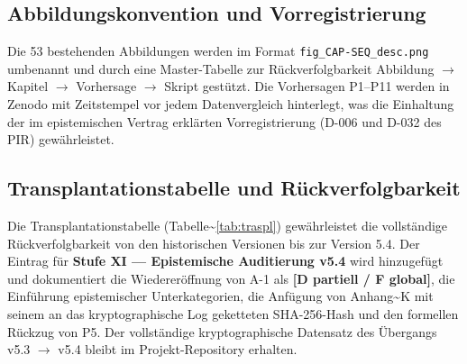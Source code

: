 ﻿\documentclass[11pt,letterpaper]{article}
\begin{document}
\subsection{Abbildungskonvention und Vorregistrierung}
Die 53 bestehenden Abbildungen werden im Format \texttt{fig\_CAP-SEQ\_desc.png} umbenannt und durch eine Master-Tabelle zur Rückverfolgbarkeit Abbildung $\to$ Kapitel $\to$ Vorhersage $\to$ Skript gestützt. Die Vorhersagen P1--P11 werden in Zenodo mit Zeitstempel vor jedem Datenvergleich hinterlegt, was die Einhaltung der im epistemischen Vertrag erklärten Vorregistrierung (D-006 und D-032 des PIR) gewährleistet.
\subsection{Transplantationstabelle und Rückverfolgbarkeit}
Die Transplantationstabelle (Tabelle\textasciitilde{}\ref{tab:traspl}) gewährleistet die vollständige Rückverfolgbarkeit von den historischen Versionen bis zur Version 5.4. Der Eintrag für \textbf{Stufe XI --- Epistemische Auditierung v5.4} wird hinzugefügt und dokumentiert die Wiedereröffnung von A-1 als \textbf{[D partiell / F global]}, die Einführung epistemischer Unterkategorien, die Anfügung von Anhang\textasciitilde{}K mit seinem an das kryptographische Log geketteten SHA-256-Hash und den formellen Rückzug von P5. Der vollständige kryptographische Datensatz des Übergangs v5.3 $\to$ v5.4 bleibt im Projekt-Repository erhalten.
\end{document}
